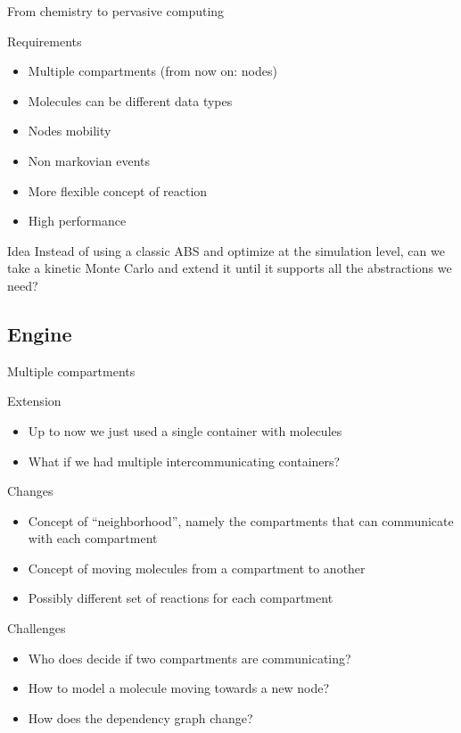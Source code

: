 \documentclass[presentation]{beamer}
\begin{document}
\begin{frame}{From chemistry to pervasive computing}
 \begin{block}{Requirements}
  \begin{itemize}
   \item Multiple compartments (from now on: nodes)
   \item Molecules can be different data types
   \item Nodes mobility
   \item Non markovian events
   \item More flexible concept of reaction
   \item High performance
  \end{itemize}
 \end{block}
 \begin{block}{Idea}
  Instead of using a classic ABS and optimize at the simulation level, can we take a kinetic Monte Carlo and extend it until it supports all the abstractions we need?
 \end{block}
\end{frame}

\subsection{Engine}

\begin{frame}{Multiple compartments}
 \begin{block}{Extension}
  \begin{itemize}
   \item Up to now we just used a single container with molecules
   \item What if we had multiple intercommunicating containers?
  \end{itemize}
 \end{block}
 \begin{block}{Changes}
  \begin{itemize}
   \item Concept of ``neighborhood'', namely the compartments that can communicate with each compartment
   \item Concept of moving molecules from a compartment to another
   \item Possibly different set of reactions for each compartment
  \end{itemize}
 \end{block}
 \begin{block}{Challenges}
  \begin{itemize}
   \item Who does decide if two compartments are communicating?
   \item How to model a molecule moving towards a new node?
   \item How does the dependency graph change?
  \end{itemize}
 \end{block}
\end{frame}
\end{document}

